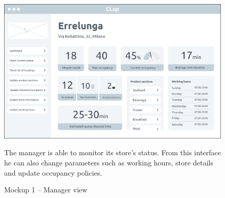 \documentclass[a4paper,oneside,11pt]{book}   %
\begin{document}
    \begin{figure}[H]
        \centering
        \includegraphics[width=.97\textwidth, height=\textheight, keepaspectratio]{pictures/mockups/manager_view}
        \caption{Mockup 1 -- Manager view}{The manager is able to monitor its store's status. From this interface he can also change parameters such as working hours, store details and update occupancy policies.}
        \label{figure:mockup_1_manager}
    \end{figure}
    
\end{document}
